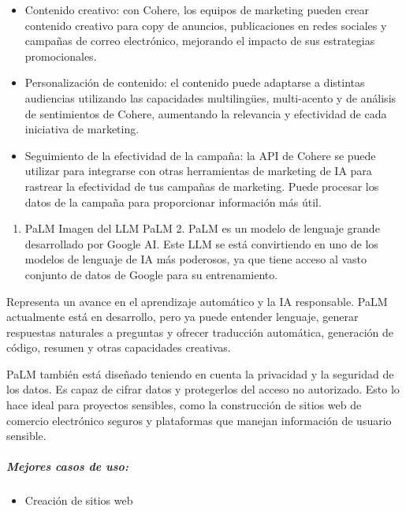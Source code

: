 \documentclass[a4paper12pt]{article}
\providecommand{\tightlist}{%
      \setlength{\itemsep}{0pt}\setlength{\parskip}{0pt}}
\begin{document}
\begin{itemize}
\tightlist
\item
  Contenido creativo: con Cohere, los equipos de marketing pueden crear
  contenido creativo para copy de anuncios, publicaciones en redes
  sociales y campañas de correo electrónico, mejorando el impacto de sus
  estrategias promocionales.
\item
  Personalización de contenido: el contenido puede adaptarse a distintas
  audiencias utilizando las capacidades multilingües, multi-acento y de
  análisis de sentimientos de Cohere, aumentando la relevancia y
  efectividad de cada iniciativa de marketing.
\item
  Seguimiento de la efectividad de la campaña: la API de Cohere se puede
  utilizar para integrarse con otras herramientas de marketing de IA
  para rastrear la efectividad de tus campañas de marketing. Puede
  procesar los datos de la campaña para proporcionar información más
  útil.
\end{itemize}

\begin{enumerate}
\def\labelenumi{\arabic{enumi}.}
\setcounter{enumi}{6}
\tightlist
\item
  PaLM Imagen del LLM PaLM 2. PaLM es un modelo de lenguaje grande
  desarrollado por Google AI. Este LLM se está convirtiendo en uno de
  los modelos de lenguaje de IA más poderosos, ya que tiene acceso al
  vasto conjunto de datos de Google para su entrenamiento.
\end{enumerate}

Representa un avance en el aprendizaje automático y la IA responsable.
PaLM actualmente está en desarrollo, pero ya puede entender lenguaje,
generar respuestas naturales a preguntas y ofrecer traducción
automática, generación de código, resumen y otras capacidades creativas.

PaLM también está diseñado teniendo en cuenta la privacidad y la
seguridad de los datos. Es capaz de cifrar datos y protegerlos del
acceso no autorizado. Esto lo hace ideal para proyectos sensibles, como
la construcción de sitios web de comercio electrónico seguros y
plataformas que manejan información de usuario sensible.

\hypertarget{mejores-casos-de-uso-6}{%
\subparagraph{Mejores casos de uso:}\label{mejores-casos-de-uso-6}}

\begin{itemize}
\tightlist
\item
  Creación de sitios web
\end{itemize}
\end{document}
